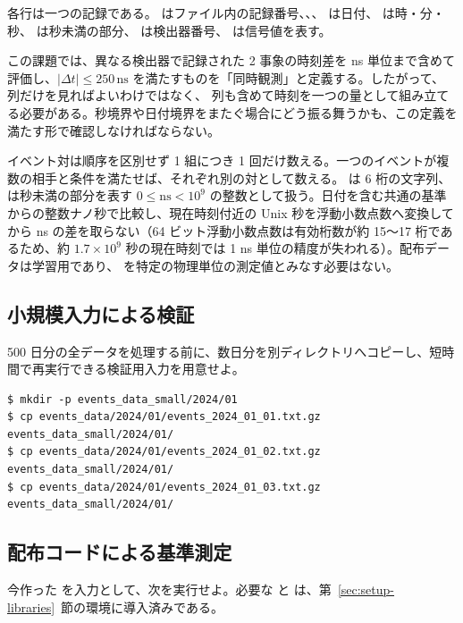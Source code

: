 各行は一つの記録である。 はファイル内の記録番号、、、 は日付、 は時・分・秒、 は秒未満の部分、 は検出器番号、 は信号値を表す。

この課題では、異なる検出器で記録された 2 事象の時刻差を ns 単位まで含めて評価し、\(\lvert \Delta t \rvert \le 250\,\mathrm{ns}\) を満たすものを「同時観測」と定義する。したがって、 列だけを見ればよいわけではなく、 列も含めて時刻を一つの量として組み立てる必要がある。秒境界や日付境界をまたぐ場合にどう振る舞うかも、この定義を満たす形で確認しなければならない。

イベント対は順序を区別せず 1 組につき 1 回だけ数える。一つのイベントが複数の相手と条件を満たせば、それぞれ別の対として数える。 は 6 桁の文字列、 は秒未満の部分を表す \(0\leq\mathrm{ns}<10^9\) の整数として扱う。日付を含む共通の基準からの整数ナノ秒で比較し、現在時刻付近の Unix 秒を浮動小数点数へ変換してから ns の差を取らない（64 ビット浮動小数点数は有効桁数が約 15～17 桁であるため、約 $1.7 \times 10^9$ 秒の現在時刻では 1 ns 単位の精度が失われる）。配布データは学習用であり、 を特定の物理単位の測定値とみなす必要はない。

\subsection{小規模入力による検証}

500 日分の全データを処理する前に、数日分を別ディレクトリへコピーし、短時間で再実行できる検証用入力を用意せよ。

\begin{lstlisting}[numbers=none, xleftmargin=2\zw]
$ mkdir -p events_data_small/2024/01
$ cp events_data/2024/01/events_2024_01_01.txt.gz events_data_small/2024/01/
$ cp events_data/2024/01/events_2024_01_02.txt.gz events_data_small/2024/01/
$ cp events_data/2024/01/events_2024_01_03.txt.gz events_data_small/2024/01/
\end{lstlisting}

\subsection{配布コードによる基準測定}

今作った  を入力として、次を実行せよ。必要な  と  は、第~\ref{sec:setup-libraries}~節の環境に導入済みである。

